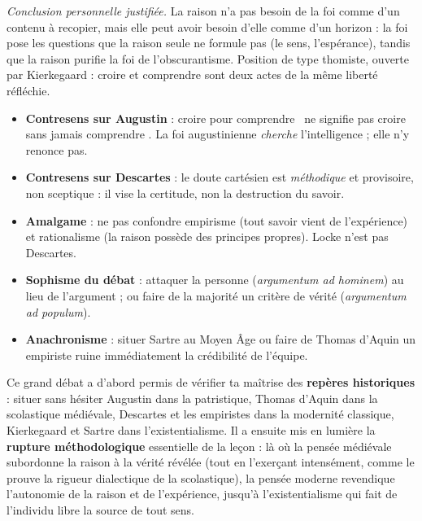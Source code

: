 \documentclass[11pt]{article}
\newcounter{popsec}
\newcounter{popsub}
\newcommand{\courssub}[1]{%
  \stepcounter{popsub}%
  \par\vspace{9pt}\noindent{\popxbold\fontsize{11.5}{13}\selectfont\color{popink}{\color{poporange}\thepopsec.\thepopsub}\hspace{6pt}#1}\par\nopagebreak\vspace{4pt}
}
\begin{document}
\begin{exoresolu}
\emph{Conclusion personnelle justifiée.} La raison n'a pas besoin de la foi comme d'un contenu à recopier, mais elle peut avoir besoin d'elle comme d'un horizon : la foi pose les questions que la raison seule ne formule pas (le sens, l'espérance), tandis que la raison purifie la foi de l'obscurantisme. Position de type thomiste, ouverte par Kierkegaard : croire et comprendre sont deux actes de la même liberté réfléchie.
\end{exoresolu}

\begin{attention}
\begin{itemize}
\item \textbf{Contresens sur Augustin} : \guillemotleft croire pour comprendre \guillemotright\ ne signifie pas \guillemotleft croire sans jamais comprendre \guillemotright. La foi augustinienne \emph{cherche} l'intelligence ; elle n'y renonce pas.
\item \textbf{Contresens sur Descartes} : le doute cartésien est \emph{méthodique} et provisoire, non sceptique : il vise la certitude, non la destruction du savoir.
\item \textbf{Amalgame} : ne pas confondre empirisme (tout savoir vient de l'expérience) et rationalisme (la raison possède des principes propres). Locke n'est pas Descartes.
\item \textbf{Sophisme du débat} : attaquer la personne (\emph{argumentum ad hominem}) au lieu de l'argument ; ou faire de la majorité un critère de vérité (\emph{argumentum ad populum}).
\item \textbf{Anachronisme} : situer Sartre au Moyen Âge ou faire de Thomas d'Aquin un empiriste ruine immédiatement la crédibilité de l'équipe.
\end{itemize}
\end{attention}

\courssub{Bilan de l'activité}

Ce grand débat a d'abord permis de vérifier ta maîtrise des \textbf{repères historiques} : situer sans hésiter Augustin dans la patristique, Thomas d'Aquin dans la scolastique médiévale, Descartes et les empiristes dans la modernité classique, Kierkegaard et Sartre dans l'existentialisme. Il a ensuite mis en lumière la \textbf{rupture méthodologique} essentielle de la leçon : là où la pensée médiévale subordonne la raison à la vérité révélée (tout en l'exerçant intensément, comme le prouve la rigueur dialectique de la scolastique), la pensée moderne revendique l'autonomie de la raison et de l'expérience, jusqu'à l'existentialisme qui fait de l'individu libre la source de tout sens.
\end{document}
